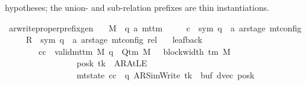 \begin{isabellebody}
\begin{isamarkuptext}
   hypotheses; the union- and sub-relation prefixes
  are thin instantiations.%
\end{isamarkuptext}\isamarkuptrue%
\isamarkupfalse%
\ ar{\isacharunderscore}{\kern0pt}write{\isacharunderscore}{\kern0pt}proper{\isacharunderscore}{\kern0pt}prefix{\isacharunderscore}{\kern0pt}gen{\isacharcolon}{\kern0pt}\isanewline
\ \ \ M\ {\isacharcolon}{\kern0pt}{\isacharcolon}{\kern0pt}\ {\isachardoublequoteopen}{\isacharparenleft}{\kern0pt}{\isacharprime}{\kern0pt}q{\isacharcomma}{\kern0pt}\ {\isacharprime}{\kern0pt}a{\isacharparenright}{\kern0pt}\ mttm{\isachardoublequoteclose}\isanewline
\ \ \ \ \ c{\isacharprime}{\kern0pt}\ {\isacharcolon}{\kern0pt}{\isacharcolon}{\kern0pt}\ {\isachardoublequoteopen}{\isacharparenleft}{\kern0pt}sym{}{\isacharcomma}{\kern0pt}\ {\isacharprime}{\kern0pt}q\ {\isasymtimes}\ {\isacharprime}{\kern0pt}a\ ar{\isacharunderscore}{\kern0pt}stage{\isacharparenright}{\kern0pt}\ mt{\isacharunderscore}{\kern0pt}config{\isachardoublequoteclose}\isanewline
\ \ \ \ \ R{\isacharprime}{\kern0pt}\ {\isacharcolon}{\kern0pt}{\isacharcolon}{\kern0pt}\ {\isachardoublequoteopen}{\isacharparenleft}{\kern0pt}sym{}{\isacharcomma}{\kern0pt}\ {\isacharprime}{\kern0pt}q\ {\isasymtimes}\ {\isacharprime}{\kern0pt}a\ ar{\isacharunderscore}{\kern0pt}stage{\isacharparenright}{\kern0pt}\ mt{\isacharunderscore}{\kern0pt}config\ rel{\isachardoublequoteclose}\isanewline
\ \ \ leaf{\isacharunderscore}{\kern0pt}back{\isacharcolon}{\kern0pt}\isanewline
\ \ \ \ \ \ \ \ {\isachardoublequoteopen}{\isasymAnd}cc{\isachardot}{\kern0pt}\ {\isasymlbrakk}\ valid{\isacharunderscore}{\kern0pt}mttm\ M{\isacharsemicolon}{\kern0pt}\ q\ {\isasymin}\ Q{\isacharunderscore}{\kern0pt}tm\ M{\isacharsemicolon}{\kern0pt}\ {}\ {\isasymle}\ block{\isacharunderscore}{\kern0pt}width\ {\isacharparenleft}{\kern0pt}{\isasymGamma}{\isacharunderscore}{\kern0pt}tm\ M{\isacharparenright}{\kern0pt}{\isacharsemicolon}{\kern0pt}\isanewline
\ \ \ \ \ \ \ \ \ \ \ \ \ \ \ \ \ posk\ tk\ {\isasymnoteq}\ AR{\isacharunderscore}{\kern0pt}AtLE{\isacharsemicolon}{\kern0pt}\isanewline
\ \ \ \ \ \ \ \ \ \ \ \ \ \ \ \ \ mt{\isacharunderscore}{\kern0pt}state\ cc\ {\isacharequal}{\kern0pt}\ {\isacharparenleft}{\kern0pt}q{\isacharcomma}{\kern0pt}\ AR{\isacharunderscore}{\kern0pt}SimWrite{\isacharcomma}{\kern0pt}\ tk{\isacharcomma}{\kern0pt}\ {}{\isacharcomma}{\kern0pt}\ buf{\isacharcomma}{\kern0pt}\ dvec{\isacharcomma}{\kern0pt}\ posk{\isacharparenright}{\kern0pt}{\isacharsemicolon}{\kern0pt}\isanewline

\end{isabellebody}
